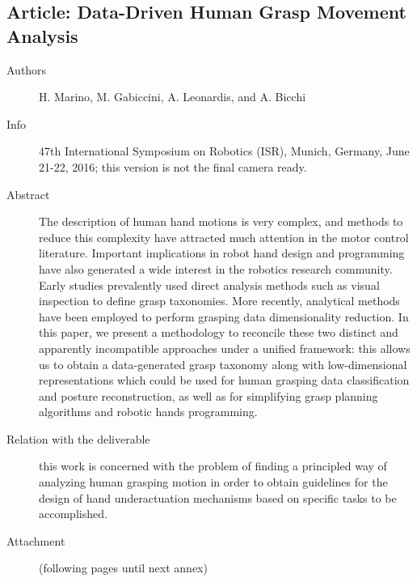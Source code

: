 \documentclass[a4paper,11pt,pdf]{pacmanreport}
\begin{document}

\subsection{Article: Data-Driven Human Grasp Movement Analysis}
\label{ann:DataDrivenHumanGraspMovementAnalysis}
\begin{description}
    \item[Authors] H. Marino, M. Gabiccini, A. Leonardis, and A. Bicchi
    \item[Info] 47th International Symposium on Robotics
(ISR), Munich, Germany, June 21-22, 2016; this version is not the final
camera ready.
    \item[Abstract] The description of human hand motions is very complex, and methods to reduce this complexity have attracted much attention in the motor control literature. Important implications in robot hand design and programming have also generated a wide interest in the robotics research community.
    Early studies prevalently used direct analysis methods such as visual inspection to define grasp taxonomies. More recently, analytical methods have been employed to perform grasping data dimensionality reduction. In this paper, we present a methodology to reconcile these two distinct and apparently incompatible approaches under a unified framework: this allows us to obtain a data-generated grasp taxonomy along with low-dimensional representations which could be used for human grasping data classification and posture reconstruction, as well as for simplifying grasp planning algorithms and robotic hands programming.
    \item[Relation with the deliverable] this work is concerned with the problem of finding a principled way of analyzing human grasping motion in order to obtain guidelines for the design of hand underactuation mechanisms based on specific tasks to be accomplished.
    \item[Attachment] (following pages until next annex)
\end{description}

\end{document}
